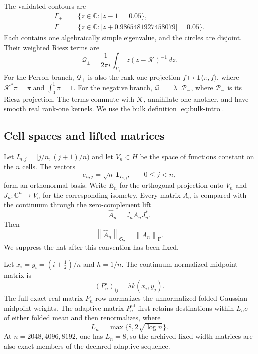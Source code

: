 \documentclass[11pt]{article}
\theoremstyle{definition}
\theoremstyle{remark}
\newcommand{\C}{\mathbb C}
\newcommand{\cK}{\mathcal K}
\newcommand{\cP}{\mathcal P}
\newcommand{\cQ}{\mathcal Q}
\newcommand{\norm}[1]{\left\lVert #1\right\rVert}
\begin{document}
The validated contours are
\begin{align}
 \Gamma_+&=\{z\in\C:|z-1|=0.05\},
 \label{eq:perron-contour}\\
 \Gamma_-&=\{z\in\C:|z+0.9865481927458079|=0.05\}.
 \label{eq:parity-contour}
\end{align}
Each contains one algebraically simple eigenvalue, and the circles are
disjoint.  Their weighted Riesz terms are
\begin{equation}
 \cQ_\pm
 =\frac{1}{2\pi i}\int_{\Gamma_\pm}
 z(z-\cK)^{-1}\,dz.
 \label{eq:weighted-riesz}
\end{equation}
For the Perron branch, $\cQ_+$ is also the rank-one projection
$f\mapsto\mathbf1\langle\pi,f\rangle$, where
$\cK^*\pi=\pi$ and $\int_0^1\pi=1$.  For the negative branch,
$\cQ_-=\lambda_-\cP_-$, where $\cP_-$ is its Riesz projection.  The
terms commute with $\cK$, annihilate one another, and have smooth real
rank-one kernels.  We use the bulk definition \eqref{eq:bulk-intro}.

\subsection{Cell spaces and lifted matrices}

Let $I_{n,j}=[j/n,(j+1)/n)$ and let $V_n\subset H$ be the space of
functions constant on the $n$ cells.  The vectors
\[
 e_{n,j}=\sqrt n\,\mathbf1_{I_{n,j}},
 \qquad 0\le j<n,
\]
form an orthonormal basis.  Write $E_n$ for the orthogonal projection onto
$V_n$ and $J_n:\C^n\to V_n$ for the corresponding isometry.  Every matrix
$A_n$ is compared with the continuum through the zero-complement lift
\begin{equation}
 \widehat A_n=J_nA_nJ_n^*.
 \label{eq:matrix-lift}
\end{equation}
Then
\[
 \norm{\widehat A_n}_{\mathfrak S_2}=\norm{A_n}_{\mathrm F}.
\]
We suppress the hat after this convention has been fixed.

Let $x_i=y_i=(i+\tfrac12)/n$ and $h=1/n$.  The continuum-normalized
midpoint matrix is
\begin{equation}
 (P_n^\circ)_{ij}=h k(x_i,y_j).
 \label{eq:midpoint-matrix}
\end{equation}
The full exact-real matrix $P_n$ row-normalizes the unnormalized folded
Gaussian midpoint weights.  The adaptive matrix $P_n^{\mathrm{ad}}$ first
retains destinations within $L_n\sigma$ of either folded mean and then
renormalizes, where
\begin{equation}
 L_n=\max\{8,2\sqrt{\log n}\}.
 \label{eq:adaptive-schedule}
\end{equation}
At $n=2048,4096,8192$, one has $L_n=8$, so the archived fixed-width
matrices are also exact members of the declared adaptive sequence.
\end{document}
